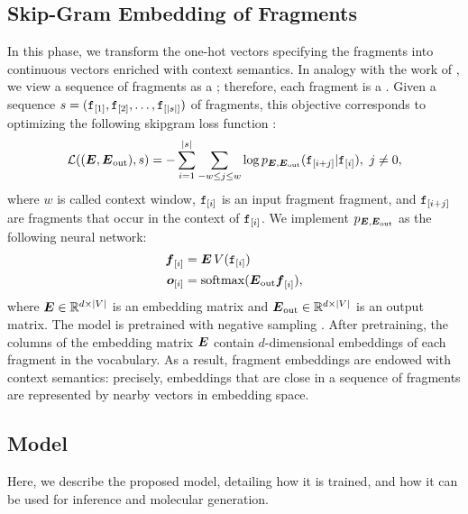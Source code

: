 \subsection{Skip-Gram Embedding of Fragments}
In this phase, we transform the one-hot vectors specifying the fragments into continuous vectors enriched with context semantics. In analogy with the work of \citet{bowman2016sentencescontinuousspace}, we view a sequence of fragments as a ; therefore, each fragment is a . Given a sequence $s = (\mathtt{f}_{[1]}, \mathtt{f}_{[2]}, \ldots, \mathtt{f}_{[|s|]})$ of fragments, this objective corresponds to optimizing the following skipgram loss function \citep{mikolov2014skipgram}:
$$\Loss((\Matrix{E}, \Matrix{E}_{\mathrm{out}}), s) = - \sum_{i=1}^{|s|}\sum_{-w \leq j \leq w} \log p_{\Matrix{E}, \Matrix{E}_{\mathrm{out}}}(\Graph{f}_{[i+j]}| \Graph{f}_{[i]}),\ j \neq 0,$$
where $w$ is called context window, $\mathtt{f}_{[i]}$ is an input fragment fragment, and $\mathtt{f}_{[i+j]}$ are fragments that occur in the context of $\mathtt{f}_{[i]}$. We implement $p_{\Matrix{E}, \Matrix{E}_{\mathrm{out}}}$ as the following neural network:
\begin{align*}
    \Elem{f}{i} &= \Matrix{E}\, V(\Graph{f}_{[i]})\\
    \Elem{o}{i} &= \softmax(\Matrix{E}_{\mathrm{out}}\Elem{f}{i}),
\end{align*}
where $\Matrix{E} \in \Real^{d \times |V|}$ is an embedding matrix and $\Matrix{E}_{\mathrm{out}} \in \Real^{d \times |V|}$ is an output matrix. The model is pretrained with negative sampling \citep{mikolov2014skipgram}. After pretraining, the columns of the embedding matrix $\Matrix{E}$ contain $d$-dimensional embeddings of each fragment in the vocabulary. As a result, fragment embeddings are endowed with context semantics: precisely, embeddings that are close in a sequence of fragments are represented by nearby vectors in embedding space.

\subsection{Model}
Here, we describe the proposed model, detailing how it is trained, and how it can be used for inference and molecular generation.


